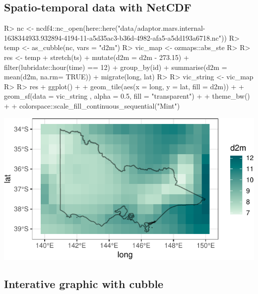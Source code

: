 \documentclass[
]{jss}
\begin{document}
\hypertarget{spatio-temporal-data-with-netcdf}{%
\subsection{Spatio-temporal data with
NetCDF}\label{spatio-temporal-data-with-netcdf}}

\begin{CodeChunk}
\begin{CodeInput}
R> nc <- ncdf4::nc_open(here::here("data/adaptor.mars.internal-1638344933.932894-4194-11-a5d35ac3-b36d-4982-afa5-a5dd193a6718.nc"))
R> temp <- as_cubble(nc, vars = "d2m")
R> vic_map <- ozmaps::abs_ste %
R> 
R> res <- temp %
+   stretch(ts) %
+   mutate(d2m = d2m - 273.15) %
+   filter(lubridate::hour(time) == 12) %
+   group_by(id) %
+   summarise(d2m = mean(d2m, na.rm= TRUE)) %
+   migrate(long, lat)
R> 
R> vic_string <- vic_map %
R> 
R> res %
+   ggplot() +
+   geom_tile(aes(x = long, y = lat, fill = d2m)) +
+   geom_sf(data = vic_string , alpha = 0.5, fill = "transparent") +
+   theme_bw() + 
+   colorspace::scale_fill_continuous_sequential("Mint")
\end{CodeInput}


\begin{center}\includegraphics{figures/unnamed-chunk-23-1} \end{center}

\end{CodeChunk}

\hypertarget{interative-graphic-with-cubble}{%
\subsection{Interative graphic with
cubble}\label{interative-graphic-with-cubble}}
\end{document}
